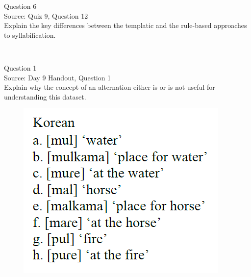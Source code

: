 \documentclass[12pt]{article}
\begin{document}
\newpage

{\large Question 6}\\

Source: Quiz 9, Question 12\\

Explain the key differences between the templatic and the rule-based approaches to syllabification.\\


\newpage

\begin{center}
\textbf{{\color{red}{\HUGE END OF EXAM}}}\\

\end{center}
\newpage

\begin{center}
\textbf{{\color{blue}{\HUGE START OF EXAM\\}}}

\textbf{{\color{blue}{\HUGE Student ID: 4199\\}}}

\textbf{{\color{blue}{\HUGE 11:50 AM - 12:10 PM\\}}}

\end{center}
\newpage

{\large Question 1}\\

Source: Day 9 Handout, Question 1\\

Explain why the concept of an alternation either is or is not useful for understanding this dataset.\\

\begin{figure}[H]
\includegraphics{../images/korean.png}
\end{figure}
\end{document}

